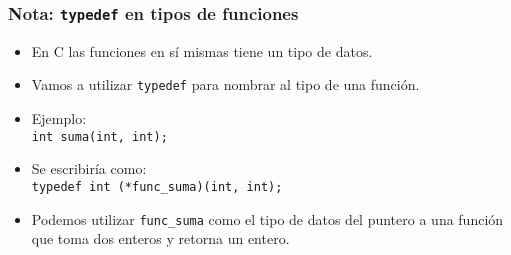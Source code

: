 \documentclass[aspectratio=169]{beamer}
\begin{document}
\begin{frame}[fragile]
    \frametitle{Nota: \texttt{typedef} en tipos de funciones}
    \large
    \begin{itemize}
    \setlength\itemsep{0.4cm}
    \item<1->[-] En C las funciones en sí mismas tiene un tipo de datos.
    \item<2->[-] Vamos a utilizar \textcolor{naranjauca}{\texttt{typedef}} para nombrar al tipo de una función.
    \item<3->[-] Ejemplo:\\
    \normalsize
    \hspace{4cm}\textcolor{verdeuca}{\texttt{int suma(int, int);}}\\
    \item<4->[-] \large Se escribiría como:\\
    \hspace{4cm}\textcolor{naranjauca}{\texttt{typedef }}\textcolor{verdeuca}{\texttt{int (*func\_suma)(int, int);}}\\
    \vspace{0.4cm}
    \item<5->[-] Podemos utilizar \textcolor{verdeuca}{\texttt{func\_suma}} como el tipo de datos del puntero a una función que toma dos enteros y retorna un entero.
    \end{itemize}
\end{frame}
\end{document}
